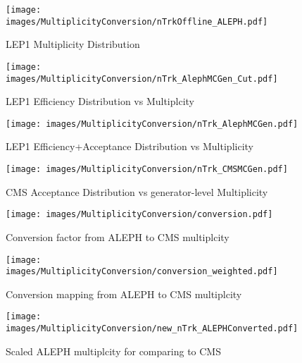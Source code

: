 \begin{figure}[!htb]
\begin{center}
\texttt{[image: images/MultiplicityConversion/nTrkOffline\_ALEPH.pdf]}
\caption{LEP1 Multiplicity Distribution}
\label{fig:LEP1Mult} 
\end{center}
\end{figure}

\begin{figure}[!htb]
\begin{center}
\texttt{[image: images/MultiplicityConversion/nTrk\_AlephMCGen\_Cut.pdf]}
\caption{LEP1 Efficiency Distribution vs Multiplcity}
\label{fig:LEP1Eff} 
\end{center}
\end{figure}

\begin{figure}[!htb]
\begin{center}
\texttt{[image: images/MultiplicityConversion/nTrk\_AlephMCGen.pdf]}
\caption{LEP1 Efficiency+Acceptance Distribution vs Multiplicity}
\label{fig:LEP1EffAccept} 
\end{center}
\end{figure}

\begin{figure}[!htb]
\begin{center}
\texttt{[image: images/MultiplicityConversion/nTrk\_CMSMCGen.pdf]}
\caption{CMS Acceptance Distribution vs generator-level Multiplicity}
\label{fig:CMSAcc} 
\end{center}
\end{figure}

\begin{figure}[!htb]
\begin{center}
\texttt{[image: images/MultiplicityConversion/conversion.pdf]}
\caption{Conversion factor from ALEPH to CMS multiplcity}
\label{fig:conversion} 
\end{center}
\end{figure}

\begin{figure}[!htb]
\begin{center}
\texttt{[image: images/MultiplicityConversion/conversion\_weighted.pdf]}
\caption{Conversion mapping from ALEPH to CMS multiplcity}
\label{fig:conversion2} 
\end{center}
\end{figure}

\begin{figure}[!htb]
\begin{center}
\texttt{[image: images/MultiplicityConversion/new\_nTrk\_ALEPHConverted.pdf]}
\caption{Scaled ALEPH multiplcity for comparing to CMS}
\label{fig:CMSComparison} 
\end{center}
\end{figure}